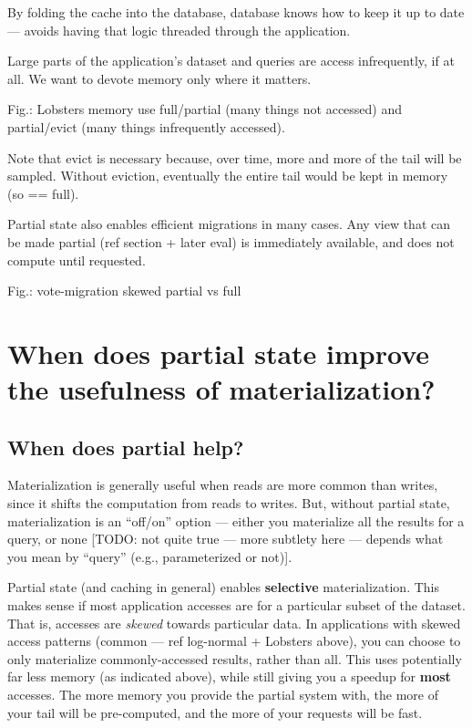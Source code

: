 By folding the cache into the database, database knows how to keep it up
to date — avoids having that logic threaded through the application.

Large parts of the application's dataset and queries are access
infrequently, if at all. We want to devote memory only where it matters.

Fig.: Lobsters memory use full/partial (many things not accessed) and
partial/evict (many things infrequently accessed).

Note that evict is necessary because, over time, more and more of the
tail will be sampled. Without eviction, eventually the entire tail would
be kept in memory (so == full).

Partial state also enables efficient migrations in many cases. Any view
that can be made partial (ref section + later eval) is immediately
available, and does not compute until requested.

Fig.: vote-migration skewed partial vs full

\section{When does partial state improve the usefulness of materialization?}
\label{s:eval:when}

\subsection{When does partial help?}

Materialization is generally useful when reads are more common than
writes, since it shifts the computation from reads to writes.
But, without partial state, materialization is an ``off/on'' option —
either you materialize all the results for a query, or none [TODO: not
quite true — more subtlety here — depends what you mean by ``query''
(e.g., parameterized or not)].

Partial state (and caching in general) enables \textbf{selective}
materialization. This makes sense if most application accesses are for
a particular subset of the dataset. That is, accesses are \textit{skewed}
towards particular data. In applications with skewed access patterns
(common — ref log-normal + Lobsters above), you can choose to only
materialize commonly-accessed results, rather than all. This uses
potentially far less memory (as indicated above), while still giving you
a speedup for \textbf{most} accesses. The more memory you provide the partial
system with, the more of your tail will be pre-computed, and the more of
your requests will be fast.

